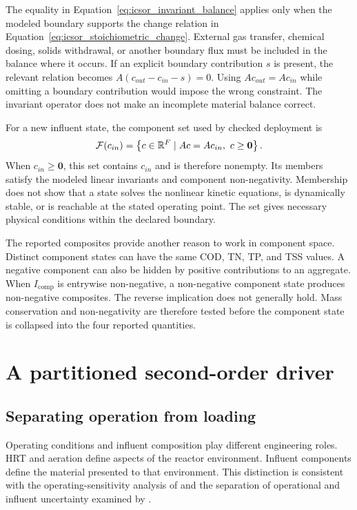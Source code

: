 The equality in Equation~\eqref{eq:icsor_invariant_balance} applies only when the modeled boundary supports the change relation in Equation~\eqref{eq:icsor_stoichiometric_change}. External gas transfer, chemical dosing, solids withdrawal, or another boundary flux must be included in the balance where it occurs. If an explicit boundary contribution \(s\) is present, the relevant relation becomes \(A(c_{out}-c_{in}-s)=0\). Using \(Ac_{out}=Ac_{in}\) while omitting a boundary contribution would impose the wrong constraint. The invariant operator does not make an incomplete material balance correct.

For a new influent state, the component set used by checked deployment is
\begin{equation}
\equationname{Structured-regression feasible set for mass conservation and non-negativity}
\label{eq:icsor_feasible_set}
\mathcal{F}(c_{in})=
\left\{c\in\mathbb{R}^{F}\mid Ac=Ac_{in},\ c\geq\mathbf{0}\right\}.
\end{equation}
When \(c_{in}\geq\mathbf{0}\), this set contains \(c_{in}\) and is therefore nonempty. Its members satisfy the modeled linear invariants and component non-negativity. Membership does not show that a state solves the nonlinear kinetic equations, is dynamically stable, or is reachable at the stated operating point. The set gives necessary physical conditions within the declared boundary.

The reported composites provide another reason to work in component space. Distinct component states can have the same COD, TN, TP, and TSS values. A negative component can also be hidden by positive contributions to an aggregate. When \(I_{\mathrm{comp}}\) is entrywise non-negative, a non-negative component state produces non-negative composites. The reverse implication does not generally hold. Mass conservation and non-negativity are therefore tested before the component state is collapsed into the four reported quantities.

\section{A partitioned second-order driver}

\subsection{Separating operation from loading}

Operating conditions and influent composition play different engineering roles. HRT and aeration define aspects of the reactor environment. Influent components define the material presented to that environment. This distinction is consistent with the operating-sensitivity analysis of \citet{Araujo2013} and the separation of operational and influent uncertainty examined by \citet{Machado2014}.

